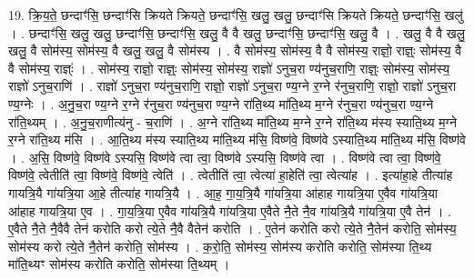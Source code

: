 \documentclass[17pt]{extarticle}
\begin{document}
19. क्रि॒य॒ते॒ छन्दाꣳ॑सि॒ छन्दाꣳ॑सि क्रियते क्रियते॒ छन्दाꣳ॑सि॒ खलु॒ खलु॒ छन्दाꣳ॑सि क्रियते क्रियते॒ छन्दाꣳ॑सि॒ खलु॑ । . छन्दाꣳ॑सि॒ खलु॒ खलु॒ छन्दाꣳ॑सि॒ छन्दाꣳ॑सि॒ खलु॒ वै वै खलु॒ छन्दाꣳ॑सि॒ छन्दाꣳ॑सि॒ खलु॒ वै । . खलु॒ वै वै खलु॒ खलु॒ वै सोम॑स्य॒ सोम॑स्य॒ वै खलु॒ खलु॒ वै सोम॑स्य । . वै सोम॑स्य॒ सोम॑स्य॒ वै वै सोम॑स्य॒ राज्ञो॒ राज्ञ्ः॒ सोम॑स्य॒ वै वै सोम॑स्य॒ राज्ञ्ः॑ । . सोम॑स्य॒ राज्ञो॒ राज्ञ्ः॒ सोम॑स्य॒ सोम॑स्य॒ राज्ञो॑ ऽनुच॒रा ण्य॑नुच॒राणि॒ राज्ञ्ः॒ सोम॑स्य॒ सोम॑स्य॒ राज्ञो॑ ऽनुच॒राणि॑ । . राज्ञो॑ ऽनुच॒रा ण्य॑नुच॒राणि॒ राज्ञो॒ राज्ञो॑ ऽनुच॒रा ण्य॒ग्ने र॒ग्ने र॑नुच॒राणि॒ राज्ञो॒ राज्ञो॑ ऽनुच॒रा ण्य॒ग्नेः । . अ॒नु॒च॒रा ण्य॒ग्ने र॒ग्ने र॑नुच॒रा ण्य॑नुच॒रा ण्य॒ग्ने रा॑ति॒थ्य मा॑ति॒थ्य म॒ग्ने र॑नुच॒रा
ण्य॑नुच॒रा ण्य॒ग्ने रा॑ति॒थ्यम् । . अ॒नु॒च॒राणीत्य॑नु - च॒राणि॑ । . अ॒ग्ने रा॑ति॒थ्य मा॑ति॒थ्य म॒ग्ने र॒ग्ने रा॑ति॒थ्य म॑स्य स्याति॒थ्य म॒ग्ने र॒ग्ने रा॑ति॒थ्य म॑सि । . आ॒ति॒थ्य म॑स्य स्याति॒थ्य मा॑ति॒थ्य म॑सि॒ विष्ण॑वे॒ विष्ण॑वे ऽस्याति॒थ्य मा॑ति॒थ्य म॑सि॒ विष्ण॑वे । . अ॒सि॒ विष्ण॑वे॒ विष्ण॑वे ऽस्यसि॒ विष्ण॑वे त्वा त्वा॒ विष्ण॑वे ऽस्यसि॒ विष्ण॑वे त्वा । . विष्ण॑वे त्वा त्वा॒ विष्ण॑वे॒ विष्ण॑वे॒ त्वेतीति॑ त्वा॒ विष्ण॑वे॒ विष्ण॑वे॒ त्वेति॑ । . त्वेतीति॑ त्वा॒ त्वेत्या॑ हा॒हेति॑ त्वा॒ त्वेत्या॑ह । . इत्या॑हा॒हे तीत्या॑ह गायत्रि॒यै गा॑यत्रि॒या आ॒हे तीत्या॑ह गायत्रि॒यै । . आ॒ह॒ गा॒य॒त्रि॒यै गा॑यत्रि॒या आ॑हाह गायत्रि॒या ए॒वैव गा॑यत्रि॒या आ॑हाह गायत्रि॒या ए॒व । . गा॒य॒त्रि॒या ए॒वैव गा॑यत्रि॒यै गा॑यत्रि॒या ए॒वैते नै॒ते नै॒व गा॑यत्रि॒यै गा॑यत्रि॒या ए॒वै तेन॑ । . ए॒वैते नै॒ते नै॒वैवै तेन॑ करोति करो त्ये॒ते नै॒वै वैतेन॑ करोति । . ए॒तेन॑ करोति करो त्ये॒ते नै॒तेन॑ करोति॒ सोम॑स्य॒ सोम॑स्य करो त्ये॒ते नै॒तेन॑ करोति॒ सोम॑स्य । . क॒रो॒ति॒ सोम॑स्य॒ सोम॑स्य करोति करोति॒ सोम॑स्या ति॒थ्य मा॑ति॒थ्यꣳ सोम॑स्य करोति करोति॒ सोम॑स्या ति॒थ्यम् । \newline
\end{document}
